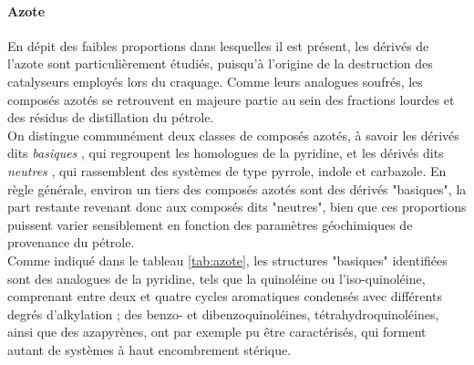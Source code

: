 \paragraph{Azote}
En dépit des faibles proportions dans lesquelles il est présent, les dérivés de l'azote sont particulièrement étudiés, puisqu'à l'origine de la destruction des catalyseurs employés lors du craquage. Comme leurs analogues soufrés, les composés azotés se retrouvent en majeure partie au sein des fractions lourdes et des résidus de distillation du pétrole. \\
On distingue communément deux classes de composés azotés, à savoir les dérivés dits \og \textit{basiques} \fg, qui regroupent les homologues de la pyridine, et les dérivés dits \og \textit{neutres} \fg, qui rassemblent des systèmes de type pyrrole, indole et carbazole.  
En règle générale, environ un tiers des composés azotés sont des dérivés "basiques", la part restante revenant donc aux composés dits "neutres", bien que ces proportions puissent varier sensiblement en fonction des paramètres géochimiques de provenance du pétrole. \\
Comme indiqué dans le tableau \ref{tab:azote}, les structures "basiques" identifiées sont des analogues de la pyridine, tels que la quinoléine ou l'iso-quinoléine, comprenant entre deux et quatre cycles aromatiques condensés avec différents degrés d'alkylation ; des benzo- et dibenzoquinoléines, tétrahydroquinoléines, ainsi que des azapyrènes, ont par exemple pu être caractérisés, qui forment autant de systèmes à haut encombrement stérique. \\

